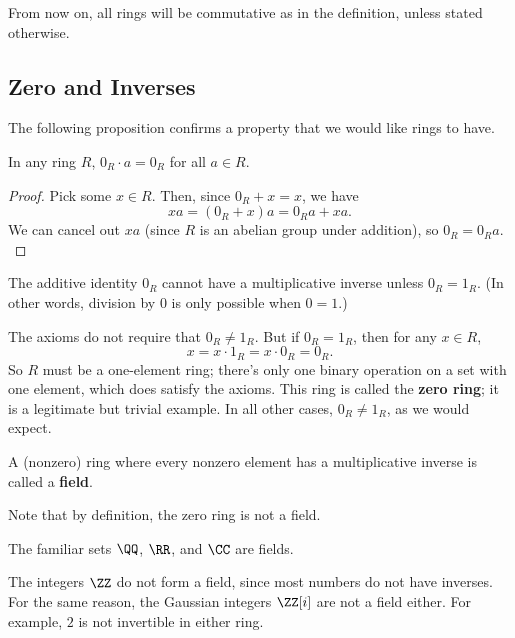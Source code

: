 From now on, all rings will be commutative as in the definition, unless stated otherwise. 

\subsection{Zero and Inverses}

The following proposition confirms a property that we would like rings to have.

\begin{proposition}
In any ring $R$, $0_R \cdot a = 0_R$ for all $a \in R$.
\end{proposition}

\begin{proof}
Pick some $x \in R$. Then, since $0_R + x = x$, we have \[xa = (0_R + x)a = 0_Ra + xa.\] We can cancel out $xa$ (since $R$ is an abelian group under addition), so $0_R = 0_Ra.$
\end{proof}

\begin{corollary}
The additive identity $0_R$ cannot have a multiplicative inverse unless $0_R = 1_R$. (In other words, division by $0$ is only possible when $0 = 1$.)
\end{corollary}

The axioms do not require that $0_R \neq 1_R$. But if $0_R = 1_R$, then for any $x \in R$, \[x = x\cdot 1_R = x\cdot 0_R = 0_R.\] So $R$ must be a one-element ring; there's only one binary operation on a set with one element, which does satisfy the axioms. This ring is called the \textbf{zero ring}; it is a legitimate but trivial example. In all other cases, $0_R \neq 1_R$, as we would expect. 

\begin{definition}
A (nonzero) ring where every nonzero element has a multiplicative inverse is called a \textbf{field}.
\end{definition}

Note that by definition, the zero ring is not a field. 

\begin{example}
The familiar sets $\QQ$, $\RR$, and $\CC$ are fields. 
\end{example}

\begin{example}
The integers $\ZZ$ do not form a field, since most numbers do not have inverses. For the same reason, the Gaussian integers $\ZZ[i]$ are not a field either. For example, $2$ is not invertible in either ring.
\end{example}

